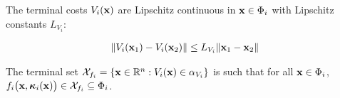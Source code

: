 \begin{gg_box}
\begin{assumption}

  The terminal costs $V_i(\bm{\mathbf{x}})$ are Lipschitz continuous in $\bm{\mathbf{x}} \in \Phi_i$
  with Lipschitz constants $L_{V_i}$:

  \begin{align}
    \| V_i(\bm{\mathbf{x}}_1) - V_i(\bm{\mathbf{x}}_2)\| \leq L_{V_i} \|\bm{\mathbf{x}}_1 - \bm{\mathbf{x}}_2 \|
  \end{align}

  \label{ass:V_i_Lipschitz}
\end{assumption}
\end{gg_box}


\begin{gg_box}
\begin{assumption}

  The terminal set $\mathcal{X}_{f_i} = \{ \bm{\mathbf{x}} \in \mathbb{R}^n : V_i(\bm{\mathbf{x}}) \in \alpha_{V_i}\}$
  is such that for all $\bm{\mathbf{x}} \in \Phi_i$, $f_i\big(\bm{\mathbf{x}}, \bm{\mathbf{\kappa}}_i(\bm{\mathbf{x}})\big) \in \mathcal{X}_{f_i} \subseteq \Phi_i$.

  \label{ass:x_f_i}
\end{assumption}
\end{gg_box}
